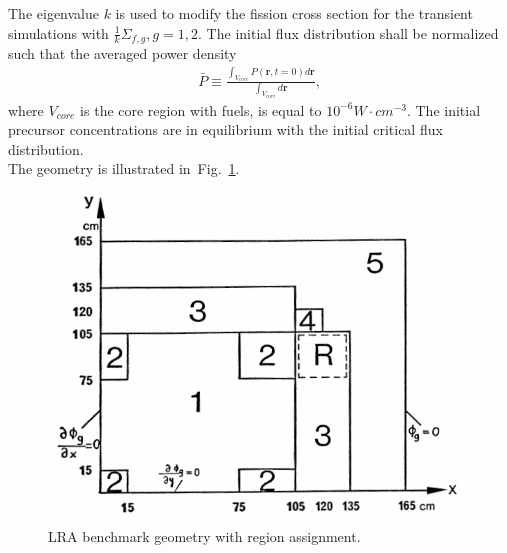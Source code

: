 \documentclass{anstrans}
\renewcommand{\vec}[1]{\bm{#1}} %
\newcommand{\fig}[1]{Fig.~\ref{#1}}                      %
\begin{document}
The eigenvalue $k$ is used to modify the fission cross section for the transient simulations with $\frac{1}{k}\Sigma_{f,g}, g=1,2$.  The initial flux distribution shall be normalized such that the averaged power density
\begin{align}
\bar{P} \equiv \frac{\int_{V_{core}} P(\vec{r}, t=0) d\vec{r}}{\int_{V_{core}} d\vec{r}},
\end{align}
where $V_{core}$ is the core region with fuels, is equal to $10^{-6} W\cdot cm^{-3}$.
The initial precursor concentrations are in equilibrium with the initial critical flux distribution.\\

The geometry is illustrated in~\fig{fig:lra-geometry}.\\
\begin{figure}[!htbp]
\centering
\includegraphics[width=0.8\linewidth]{lra.png}
\caption{LRA benchmark geometry with region assignment.}
\label{fig:lra-geometry}
\end{figure}
\end{document}
